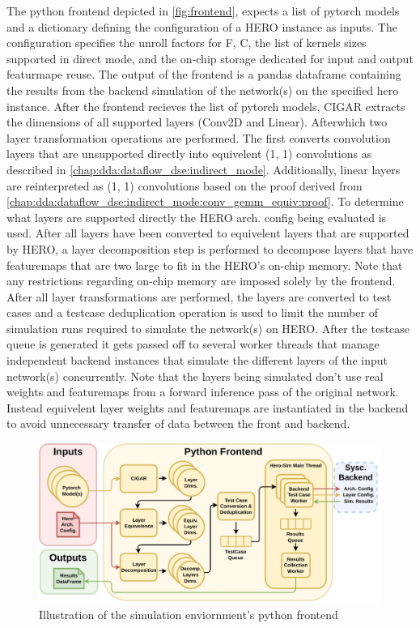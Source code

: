 The python frontend depicted in \autoref{fig:frontend}, expects a list of pytorch models and a dictionary defining the
configuration of a HERO instance as inputs. The configuration specifies the unroll factors
for F, C, the list of kernels sizes supported in direct mode, and the on-chip
storage dedicated for input and output featurmape reuse. The output of the
frontend is a pandas dataframe containing the results from the backend
simulation of the network(s) on the specified hero instance.  
After the frontend
recieves the list of pytorch models, CIGAR extracts the dimensions of all
supported layers (Conv2D and Linear). Afterwhich two layer transformation
operations are performed. The first converts convolution layers that are
unsupported directly into equivelent (1, 1) convolutions as described in
\autoref{chap:dda:dataflow_dse:indirect_mode}. Additionally, linear layers are
reinterpreted as (1, 1) convolutions based on the proof derived from
\autoref{chap:dda:dataflow_dse:indirect_mode:conv_gemm_equiv:proof}. To
determine what layers are supported directly the HERO arch. config being
evaluated is used. After all layers have been converted to equivelent layers
that are supported by HERO, a layer decomposition step is performed to
decompose layers that have featuremaps that are two large to fit in the
HERO's on-chip memory. Note that any restrictions regarding on-chip
memory are imposed solely by the frontend. After all layer transformations are
performed, the layers are converted to test cases and a testcase deduplication
operation is used to limit the number of simulation runs required to simulate the network(s)
on HERO. After the testcase queue is generated it gets passed off to several
worker threads that manage independent backend instances that simulate the different
layers of the input network(s) concurrently. Note that the layers being
simulated don't use real weights and featuremaps from a forward inference pass
of the original network. Instead equivelent layer weights and featuremaps are
instantiated in the backend to avoid unnecessary transfer of data between the
front and backend.      


\begin{figure}[ht]
    \centering
    \includegraphics[scale=0.58]{fig/hero-sim-frontend.pdf}
    \caption{Illustration of the simulation enviornment's python frontend}
    \label{fig:frontend}
\end{figure}


